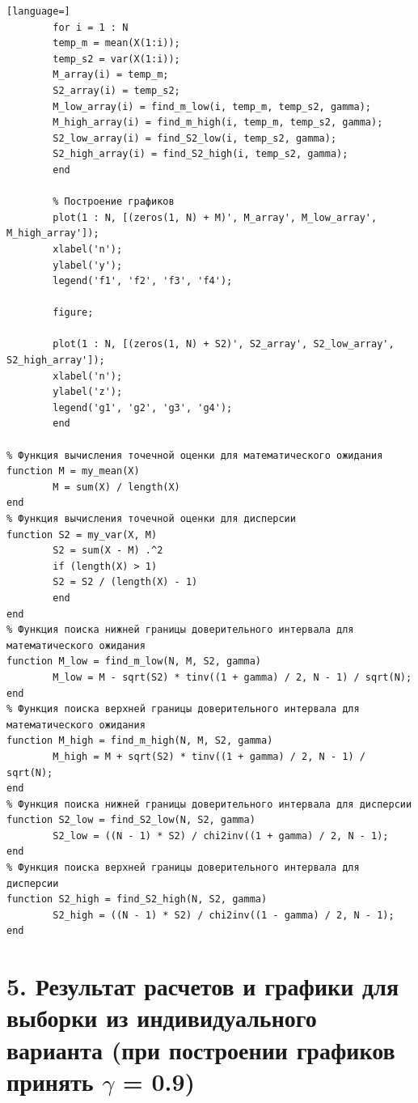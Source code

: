 \documentclass[12pt,a4paper]{scrreprt}
\begin{document}
\begin{lstlisting}[language=]
		for i = 1 : N
		temp_m = mean(X(1:i));
		temp_s2 = var(X(1:i));
		M_array(i) = temp_m;
		S2_array(i) = temp_s2;
		M_low_array(i) = find_m_low(i, temp_m, temp_s2, gamma);
		M_high_array(i) = find_m_high(i, temp_m, temp_s2, gamma);
		S2_low_array(i) = find_S2_low(i, temp_s2, gamma);
		S2_high_array(i) = find_S2_high(i, temp_s2, gamma);
		end
		
		% Построение графиков
		plot(1 : N, [(zeros(1, N) + M)', M_array', M_low_array', M_high_array']);
		xlabel('n');
		ylabel('y');
		legend('f1', 'f2', 'f3', 'f4');
		
		figure;
		
		plot(1 : N, [(zeros(1, N) + S2)', S2_array', S2_low_array', S2_high_array']);
		xlabel('n');
		ylabel('z');
		legend('g1', 'g2', 'g3', 'g4');
		end

% Функция вычисления точечной оценки для математического ожидания
function M = my_mean(X)
		M = sum(X) / length(X)
end
% Функция вычисления точечной оценки для дисперсии
function S2 = my_var(X, M)
		S2 = sum(X - M) .^2
		if (length(X) > 1)
		S2 = S2 / (length(X) - 1)
		end
end
% Функция поиска нижней границы доверительного интервала для математического ожидания
function M_low = find_m_low(N, M, S2, gamma)
		M_low = M - sqrt(S2) * tinv((1 + gamma) / 2, N - 1) / sqrt(N);
end
% Функция поиска верхней границы доверительного интервала для математического ожидания
function M_high = find_m_high(N, M, S2, gamma)
		M_high = M + sqrt(S2) * tinv((1 + gamma) / 2, N - 1) / sqrt(N);
end
% Функция поиска нижней границы доверительного интервала для дисперсии
function S2_low = find_S2_low(N, S2, gamma)
		S2_low = ((N - 1) * S2) / chi2inv((1 + gamma) / 2, N - 1);
end
% Функция поиска верхней границы доверительного интервала для дисперсии
function S2_high = find_S2_high(N, S2, gamma)
		S2_high = ((N - 1) * S2) / chi2inv((1 - gamma) / 2, N - 1);
end
\end{lstlisting}

\section*{5. Результат расчетов и графики для выборки из индивидуального варианта (при построении графиков принять $\gamma$ = 0.9)}
\end{document}
